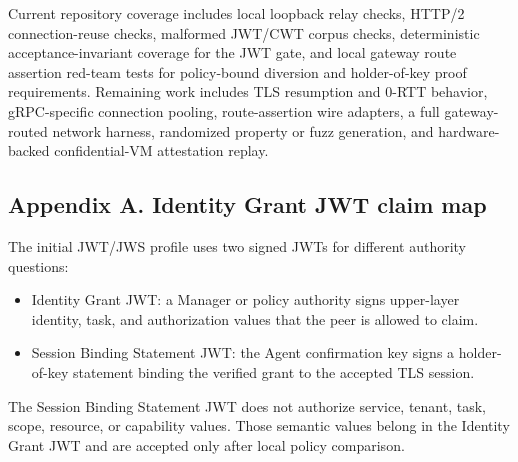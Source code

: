 \documentclass[
]{article}
\providecommand{\tightlist}{%
  \setlength{\itemsep}{0pt}\setlength{\parskip}{0pt}}
\begin{document}
Current repository coverage includes local loopback relay checks, HTTP/2
connection-reuse checks, malformed JWT/CWT corpus checks, deterministic
acceptance-invariant coverage for the JWT gate, and local gateway route
assertion red-team tests for policy-bound diversion and holder-of-key
proof requirements. Remaining work includes TLS resumption and 0-RTT
behavior, gRPC-specific connection pooling, route-assertion wire
adapters, a full gateway-routed network harness, randomized property or
fuzz generation, and hardware-backed confidential-VM attestation replay.

\subsection{Appendix A. Identity Grant JWT claim
map}\label{appendix-a.-identity-grant-jwt-claim-map}

The initial JWT/JWS profile uses two signed JWTs for different authority
questions:

\begin{itemize}
\tightlist
\item
  Identity Grant JWT: a Manager or policy authority signs upper-layer
  identity, task, and authorization values that the peer is allowed to
  claim.
\item
  Session Binding Statement JWT: the Agent confirmation key signs a
  holder-of-key statement binding the verified grant to the accepted TLS
  session.
\end{itemize}

The Session Binding Statement JWT does not authorize service, tenant,
task, scope, resource, or capability values. Those semantic values
belong in the Identity Grant JWT and are accepted only after local
policy comparison.
\end{document}
